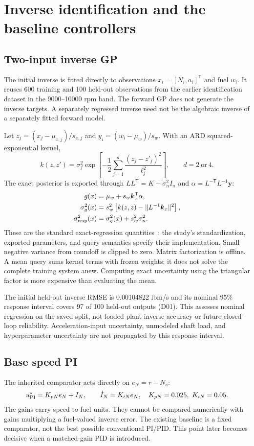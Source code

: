 \documentclass[11pt,a4paper,oneside]{report}
\begin{document}
\chapter{Inverse identification and the baseline controllers}
\section{Two-input inverse GP}
The initial inverse is fitted directly to observations $x_i=[N_i,a_i]^\mathsf T$ and fuel $w_i$. It reuses 600 training and 100 held-out observations from the earlier identification dataset in the 9000--10000 rpm band. The forward GP does not generate the inverse targets. A separately regressed inverse need not be the algebraic inverse of a separately fitted forward model.

Let $z_j=(x_j-\mu_{x,j})/s_{x,j}$ and $y_i=(w_i-\mu_w)/s_w$. With an ARD squared-exponential kernel,
\begin{equation}
k(z,z')=\sigma_f^2\exp\!\left[-\frac12\sum_{j=1}^{d}\frac{(z_j-z'_j)^2}{\ell_j^2}\right],\qquad d=2\ \text{or}\ 4.
\end{equation}
The exact posterior is exported through $LL^\mathsf T=K+\sigma_n^2I_n$ and $\alpha=L^{-\mathsf T}L^{-1}\bm y$:
\begin{align}
g(x)&=\mu_w+s_w\bm k_x^\mathsf T\alpha,\\
\sigma_g^2(x)&=s_w^2\left[k(z,z)-\|L^{-1}\bm k_x\|^2\right],\\
\sigma_{\rm resp}^2(x)&=\sigma_g^2(x)+s_w^2\sigma_n^2.
\label{eq:gpvariance}
\end{align}
These are the standard exact-regression quantities~\cite{gpml}; the study's standardization, exported parameters, and query semantics specify their implementation. Small negative variance from roundoff is clipped to zero. Matrix factorization is offline. A mean query sums kernel terms with frozen weights; it does not solve the complete training system anew. Computing exact uncertainty using the triangular factor is more expensive than evaluating the mean.

The initial held-out inverse RMSE is 0.00104822 lbm/s and its nominal 95\% response interval covers 97 of 100 held-out outputs (D01). This assesses nominal regression on the saved split, not loaded-plant inverse accuracy or future closed-loop reliability. Acceleration-input uncertainty, unmodeled shaft load, and hyperparameter uncertainty are not propagated by this response interval.

\section{Base speed PI}
The inherited comparator acts directly on $e_N=r-N_s$:
\begin{equation}
u_{\rm PI}^\star=K_{pN}e_N+I_N,\qquad \dot I_N=K_{iN}e_N,
\quad K_{pN}=0.025,\ K_{iN}=0.05.
\end{equation}
The gains carry speed-to-fuel units. They cannot be compared numerically with gains multiplying a fuel-valued inverse error. The existing baseline is a fixed comparator, not the best possible conventional PI/PID. This point later becomes decisive when a matched-gain PID is introduced.
\end{document}
